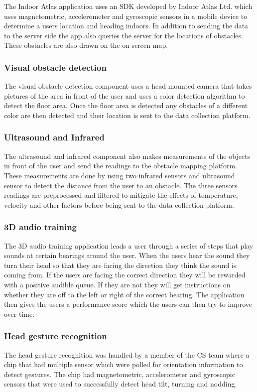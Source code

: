 \documentclass[prodmode,acmtosem]{acmsmall} %
\begin{document}
The Indoor Atlas application uses an SDK developed by Indoor Atlas Ltd. \cite{IndoorAtlas} which uses magnetometric, accelerometer and gyroscopic sensors in a mobile device to determine a users location and heading indoors. In addition to sending the data to the server side the app also queries the server for the locations of obstacles. These obstacles are also drawn on the on-screen map.

\subsubsection{Visual obstacle detection}
The visual obstacle detection component uses a head mounted camera that takes pictures of the area in front of the user and uses a color detection algorithm to detect the floor area. Once the floor area is detected any obstacles of a different color are then detected and their location is sent to the data collection platform.

\subsubsection{Ultrasound and Infrared}
The ultrasound and infrared component also makes measurements of the objects in front of the user and send the readings to the obstacle mapping platform.
These measurements are done by using two infrared sensors and ultrasound sensor to detect the distance from the user to an obstacle. The three sensors readings are preprocessed and filtered to mitigate the effects of temperature, velocity and other factors before being sent to the data collection platform. 

\subsubsection{3D audio training}
The 3D audio training application leads a user through a series of steps that play sounds at certain bearings around the user. When the users hear the sound they turn their head so that they are facing the direction they think the sound is coming from. If the users are facing the correct direction they will be rewarded with a positive audible queue. If they are not they will get instructions on whether they are off to the left or right of the correct bearing. The application then gives the users a performance score which the users can then try to improve over time.

\subsubsection{Head gesture recognition}
The head gesture recognition was handled by a member of the CS team where a chip that had multiple sensor which were polled for orientation information to detect gestures. The chip had magnetometric, accelerometer and gyroscopic sensors that were used to successfully detect head tilt, turning and nodding.
\end{document}
